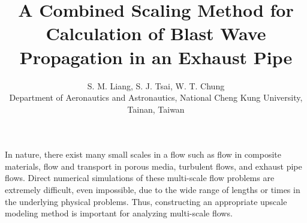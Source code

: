 \documentclass[10pt,twoside,twocolumn,letterpaper]{article}
\begin{document}
\baselineskip 10pt
\title{A Combined Scaling Method for Calculation of Blast Wave Propagation in an Exhaust Pipe}
\author{S. M. Liang,
S. J. Tsai, W. T. Chung \\
\rm{Department of Aeronautics and Astronautics,
National Cheng Kung University, Tainan, Taiwan}
\vspace{4pt}}
\maketitle
 
 \vspace{4pt}
In nature, there exist many small scales in a flow such as flow in composite materials, flow and transport in porous media, turbulent flows, and exhaust pipe flows. Direct numerical simulations of these multi-scale flow problems are extremely difficult, even impossible, due to the wide range of lengths or times in the underlying physical problems. Thus, constructing an appropriate upscale modeling method is important for analyzing multi-scale flows.
\end{document}
